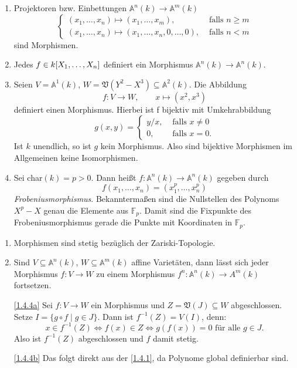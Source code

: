 \documentclass[a4paper,12pt]{scrbook}
\makeatletter
\theoremstyle{blah}
\theoremstyle{stz}
\renewcommand{\proofname}{Beweis}
\renewenvironment{proof}[1][\proofname]{\par
  \pushQED{\qed}%
  \normalfont \topsep6\p@\@plus6\p@\relax
  \trivlist
  \item[\hskip\labelsep
        \itshape
    #1\@addpunct{:}]\ignorespaces
}{%
  \popQED\endtrivlist\@endpefalse
}
\def\A{\mathbb{A}}
\def\V{\mathfrak{V}}
\newcommand{\FF}{\mathbb{F}}
\newcommand{\ra}{\longrightarrow}
\renewcommand{\mapsto}{\longmapsto}
\newcommand{\polyx}[1][n]{\ensuremath%
  [X_{1},\dotsc,X_{#1}]}
\makeatother
\begin{document}
\begin{bsp}\label{1.4.3}
\begin{enumerate}
\item\label{1.4.3a}  Projektoren bzw. Einbettungen $\A^{n}(k)\ra \A^{m}(k)$ 
\[\begin{cases} (x_1,\dotsc,x_n) \mapsto (x_1,\dotsc,x_m),&\text{ falls }n\ge m \\ (x_1,\dotsc,x_n)\mapsto (x_1,\dotsc,x_n,0,\dotsc,0),&\text{ falls }n<m \end{cases}\] sind Morphismen.
\item\label{1.4.3b} Jedes $f \in k\polyx$ definiert ein Morphismus $\A^{n}(k)\ra \A^{n}(k)$.
\item\label{1.4.3c} Seien $V=\A^1(k)$, $W=\V(Y^2-X^3) \subseteq \A^2(k)$. Die Abbildung 
\[f\colon V\ra W, \qquad x\mapsto (x^2,x^3)\]
definiert einen Morphismus.
Hierbei ist f bijektiv mit Umkehrabbildung 
\[g(x,y)=\begin{cases} y/x,&\text{ falls }x\neq 0 \\ 0,&\text{ falls }x=0. \end{cases}\]
Ist $k$ unendlich, so ist $g$ kein Morphismus. Also sind bijektive Morphismen im Allgemeinen keine Isomorphismen.
\item\label{1.4.3d} Sei char$(k)=p>0$. Dann heißt $f\colon \A^n(k)\ra \A^n(k)$ gegeben durch 
\[f(x_1,\dotsc,x_n)=(x_1^p,\dotsc,x_n^p)\] 
\emph{Frobeniusmorphismus}. Bekanntermaßen sind die Nullstellen des Polynoms $X^{p}-X$ genau die Elemente aus $\FF_p$. Damit sind die Fixpunkte des Frobeniusmorphismus gerade die Punkte mit Koordinaten in $\FF_p$.
\end{enumerate}
\end{bsp}

\begin{bem}\label{1.4.4}
\begin{enumerate}
\item\label{1.4.4a} Morphismen sind stetig bezüglich der Zariski-Topologie.
\item\label{1.4.4b} Sind $V\subseteq \A^n(k)$, $W \subseteq \A^m(k)$ affine Varietäten, dann lässt sich jeder Morphismus $f\colon V\ra W$ zu einem Morphismus $f^n\colon \A^n(k)\ra A^m(k)$ fortsetzen.
\end{enumerate}
\end{bem}

\begin{proof}
\begin{enumerate}
\item[\ref{1.4.4a}] Sei $f\colon V\ra W$ ein Morphismus und $Z=\V(J)\subseteq W$ abgeschlossen. Setze $I=\{g\circ f \mid g\in J\}$. Dann ist $f^{-1}(Z)=V(I)$, denn: 
\[x\in f^{-1}(Z)\iff f(x)\in Z \iff g(f(x))=0\text{ für alle }g\in J.\]
Also ist $f^{-1}(Z)$ abgeschlossen und $f$ damit stetig.
\item[\ref{1.4.4b}] Das folgt direkt aus der \autoref{1.4.1}, da Polynome global definierbar sind.
\end{enumerate}
\end{proof}
\end{document}
